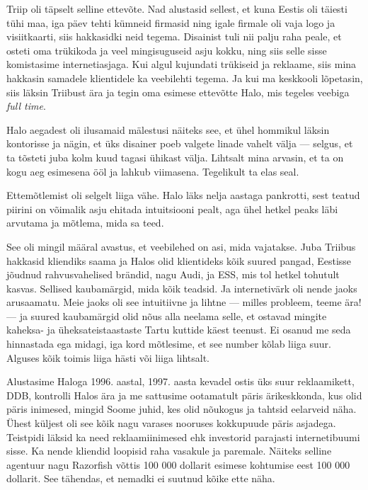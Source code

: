 Triip oli täpselt selline ettevõte. Nad alustasid sellest, et kuna Eestis oli 
täiesti tühi maa, iga päev tehti kümneid firmasid ning igale firmale oli vaja logo 
ja visiitkaarti, siis hakkasidki neid tegema. Disainist tuli nii palju raha peale, 
et osteti oma trükikoda ja veel mingisuguseid asju kokku, ning siis selle 
sisse komistasime internetiasjaga. Kui algul kujundati trükiseid ja 
reklaame, siis mina hakkasin samadele klientidele ka veebilehti tegema. Ja 
kui ma keskkooli lõpetasin, siis läksin Triibust 
ära ja tegin oma esimese ettevõtte 
Halo, mis tegeles veebiga \emph{full time}. 

Halo aegadest oli ilusamaid mälestusi näiteks see, et ühel hommikul läksin 
kontorisse ja nägin, et üks disainer poeb valgete linade vahelt välja ---
selgus, et ta tõsteti juba kolm kuud tagasi ühikast välja. Lihtsalt mina 
arvasin, et ta on kogu aeg esimesena ööl ja lahkub viimasena. Tegelikult ta 
elas seal.


Ettemõtlemist oli selgelt liiga vähe. Halo läks nelja 
aastaga pankrotti, sest teatud piirini on võimalik asju ehitada intuitsiooni 
pealt, aga ühel hetkel peaks läbi arvutama ja mõtlema, mida sa 
teed. 

See oli mingil määral avastus, et veebilehed on asi, mida vajatakse. 
Juba Triibus hakkasid kliendiks saama ja Halos olid 
klientideks kõik suured pangad, Eestisse jõudnud rahvusvahelised 
brändid, nagu Audi, ja ESS, mis tol hetkel tohutult 
kasvas. Sellised kaubamärgid, mida kõik teadsid. Ja internetivärk 
oli nende jaoks arusaamatu. Meie jaoks oli see intuitiivne ja lihtne --- 
milles probleem, teeme ära! --- ja suured kaubamärgid olid 
nõus alla neelama selle, et ostavad mingite kaheksa- ja 
üheksateistaastaste Tartu kuttide käest teenust. Ei osanud me seda hinnastada 
ega midagi, iga kord mõtlesime, et see number kõlab liiga 
suur. Alguses kõik toimis liiga hästi või liiga lihtsalt. 

Alustasime Haloga 1996. aastal, 1997. aasta kevadel ostis üks suur reklaamikett, 
DDB, kontrolli Halos ära ja me sattusime ootamatult päris 
ärikeskkonda, kus olid päris inimesed, mingid Soome juhid, kes olid nõukogus ja 
tahtsid eelarveid näha. Ühest küljest oli 
see kõik nagu varases nooruses kokkupuude päris asjadega. Teistpidi läksid ka 
need reklaamiinimesed ehk investorid
parajasti internetibuumi sisse. Ka nende kliendid loopisid raha vasakule ja 
paremale. Näiteks selline agentuur nagu Razorfish võttis 100 000 dollarit esimese 
kohtumise eest 100 000 dollarit. See tähendas, et nemadki ei 
suutnud kõike ette näha. 

